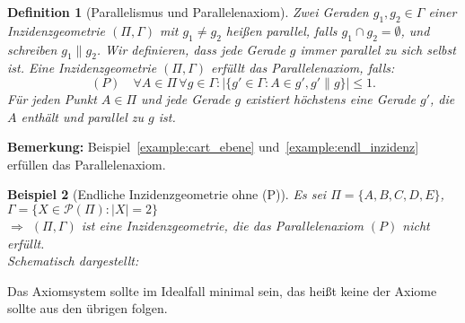 \documentclass[a4paper,12pt]{article}
\theoremstyle{break}
\newtheorem{definition}{Definition}[section]
\newtheorem{example}[definition]{Beispiel}
\begin{document}
\begin{definition}[Parallelismus und Parallelenaxiom]
Zwei Geraden $g_1, g_2 \in \Gamma$ einer Inzidenzgeometrie $(\Pi, \Gamma)$ mit $g_1 \neq g_2$ heißen parallel, falls $g_1 \cap g_2 = \emptyset$, und schreiben $g_1\parallel g_2$. Wir definieren, dass jede Gerade $g$ immer parallel zu sich selbst ist. Eine Inzidenzgeometrie $(\Pi, \Gamma)$ erfüllt das Parallelenaxiom, falls:
\[
(P) \quad \forall A \in \Pi \, \forall g \in \Gamma: \left| \{ g' \in \Gamma : A \in g', g' \parallel g \} \right| \leq 1.
\]
Für jeden Punkt $A \in \Pi$ und jede Gerade $g$ existiert höchstens eine Gerade $g'$, die $A$ enthält und parallel zu $g$ ist.
\end{definition}
\textbf{Bemerkung:} Beispiel~\ref{example:cart_ebene} und~\ref{example:endl_inzidenz} erfüllen das Parallelenaxiom.

\begin{example}[Endliche Inzidenzgeometrie ohne (P)]\label{example:inzidenz_ohne_p}
Es sei $\Pi = \{A,B,C,D,E\}$, $\Gamma = \{ X \in \mathcal{P}(\Pi) : |X| = 2 \}$ \\ $\Rightarrow$ $(\Pi, \Gamma)$ ist eine Inzidenzgeometrie, die das Parallelenaxiom $(P)$ nicht erfüllt. \\Schematisch dargestellt:
\begin{center}
\end{center}
\end{example}

Das Axiomsystem sollte im Idealfall minimal sein, das heißt keine der Axiome sollte aus den übrigen folgen.
\end{document}
